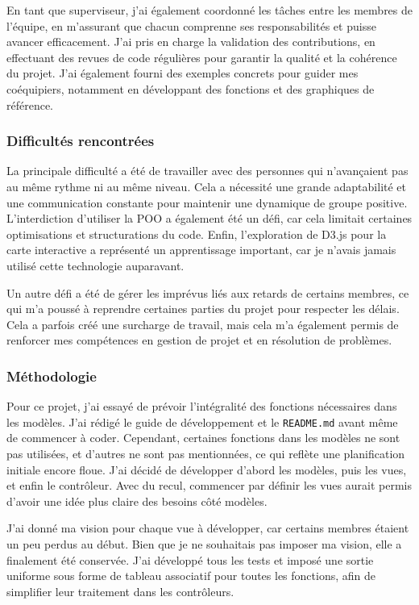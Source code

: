 \documentclass[11pt]{article}
\begin{document}
\begin{itemize}
En tant que superviseur, j’ai également coordonné les tâches entre les membres de l’équipe, en m’assurant que chacun comprenne ses responsabilités et puisse avancer efficacement. J’ai pris en charge la validation des contributions, en effectuant des revues de code régulières pour garantir la qualité et la cohérence du projet. J’ai également fourni des exemples concrets pour guider mes coéquipiers, notamment en développant des fonctions et des graphiques de référence.

\subsubsection*{Difficultés rencontrées}
La principale difficulté a été de travailler avec des personnes qui n’avançaient pas au même rythme ni au même niveau. Cela a nécessité une grande adaptabilité et une communication constante pour maintenir une dynamique de groupe positive. L’interdiction d’utiliser la POO a également été un défi, car cela limitait certaines optimisations et structurations du code. Enfin, l’exploration de D3.js pour la carte interactive a représenté un apprentissage important, car je n’avais jamais utilisé cette technologie auparavant.

Un autre défi a été de gérer les imprévus liés aux retards de certains membres, ce qui m’a poussé à reprendre certaines parties du projet pour respecter les délais. Cela a parfois créé une surcharge de travail, mais cela m’a également permis de renforcer mes compétences en gestion de projet et en résolution de problèmes.

\subsubsection*{Méthodologie}
Pour ce projet, j’ai essayé de prévoir l’intégralité des fonctions nécessaires dans les modèles. J’ai rédigé le guide de développement et le \texttt{README.md} avant même de commencer à coder. Cependant, certaines fonctions dans les modèles ne sont pas utilisées, et d’autres ne sont pas mentionnées, ce qui reflète une planification initiale encore floue. J’ai décidé de développer d’abord les modèles, puis les vues, et enfin le contrôleur. Avec du recul, commencer par définir les vues aurait permis d’avoir une idée plus claire des besoins côté modèles.

J’ai donné ma vision pour chaque vue à développer, car certains membres étaient un peu perdus au début. Bien que je ne souhaitais pas imposer ma vision, elle a finalement été conservée. J’ai développé tous les tests et imposé une sortie uniforme sous forme de tableau associatif pour toutes les fonctions, afin de simplifier leur traitement dans les contrôleurs.


\end{itemize}
\end{document}
